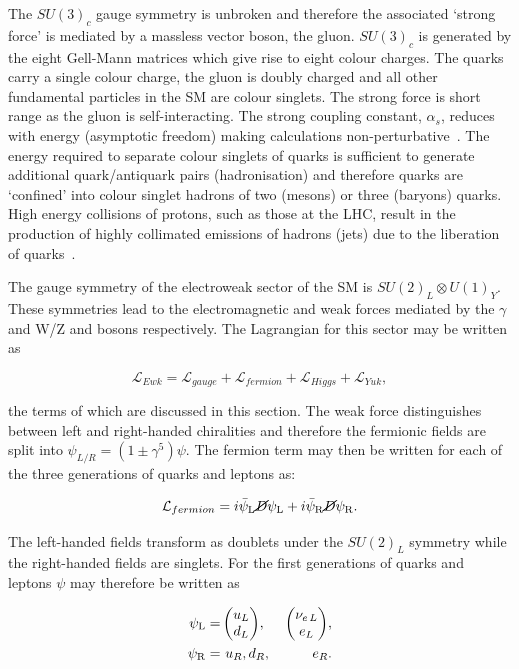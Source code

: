 The $SU(3)_c$ gauge symmetry is unbroken and therefore the associated
`strong force' is mediated by a massless vector boson, the gluon.
$SU(3)_c$ is generated by the eight Gell-Mann matrices which give rise to eight colour charges. 
The quarks carry a single colour charge, the gluon is doubly charged and all 
other fundamental particles in the SM are colour singlets. The strong force is short range
as the gluon is self-interacting.  The strong coupling constant, $\alpha_s$, 
reduces with energy (asymptotic freedom)
making calculations non-perturbative~\cite{qcd}. The energy required to separate 
colour singlets of quarks is sufficient to generate additional quark/antiquark pairs
(hadronisation) and therefore quarks are `confined' into colour singlet hadrons
of two (mesons) or three (baryons) quarks. High energy collisions of protons, 
such as those at the LHC, result in the production of highly 
collimated emissions of hadrons (jets) due to the 
liberation of quarks~\cite{salam}.


The gauge symmetry of the electroweak sector of the SM is $SU(2)_L\otimes U(1)_Y$. These symmetries lead
to the electromagnetic and weak forces mediated by the $\gamma$ and W/Z and bosons respectively.
The Lagrangian for this sector may be written as

\begin{equation}
\mathcal{L}_{Ewk} = \mathcal{L}_{gauge} + \mathcal{L}_{fermion} + \mathcal{L}_{Higgs} + \mathcal{L}_{Yuk},
\end{equation}

\noindent the terms of which are discussed in this section. The weak force distinguishes
between left and right-handed chiralities and therefore the fermionic fields are split into
$\psi_{L/R} = (1\pm\gamma^5)\psi$. The fermion term may then be written for each of the 
three generations of quarks and leptons as:

\begin{equation}
\mathcal{L}_{fermion} = i \bar{\psi}_{\mathrm{L}}\cancel{D}\psi_{\mathrm{L}} + i \bar{\psi}_{\mathrm{R}}\cancel{D}\psi_{\mathrm{R}}.
\end{equation}

\noindent The left-handed fields transform as doublets under the $SU(2)_L$ symmetry
while the right-handed fields are singlets.
For the first generations of quarks and leptons $\psi$ may therefore be written as

\begin{align}
\qquad\qquad\qquad\psi_{\mathrm{L}} =\,&{\begin{pmatrix} u_L \\ d_L \end{pmatrix}},\, &{\begin{pmatrix} \nu_{e\,L} \\ e_L \end{pmatrix}},\nonumber\qquad\qquad\qquad\\
\qquad\qquad\qquad\psi_{\mathrm{R}} = \,&\,u_R,d_R,\, &\,e_R.\qquad\qquad\qquad
\end{align}


